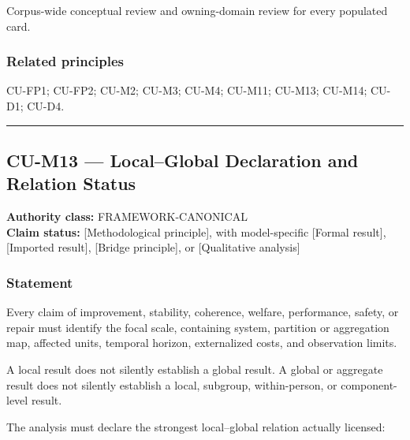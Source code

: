 \documentclass[
  11pt,
]{article}
\begin{document}
Corpus-wide conceptual review and owning-domain review for every
populated card.

\subsubsection{Related principles}\label{related-principles-3}

CU-FP1; CU-FP2; CU-M2; CU-M3; CU-M4; CU-M11; CU-M13; CU-M14; CU-D1;
CU-D4.

\begin{center}\rule{0.5\linewidth}{0.5pt}\end{center}

\subsection{CU-M13 --- Local--Global Declaration and Relation
Status}\label{cu-m13-localglobal-declaration-and-relation-status}

\textbf{Authority class:} FRAMEWORK-CANONICAL\\
\textbf{Claim status:} {[}Methodological principle{]}, with
model-specific {[}Formal result{]}, {[}Imported result{]}, {[}Bridge
principle{]}, or {[}Qualitative analysis{]}

\subsubsection{Statement}\label{statement-21}

Every claim of improvement, stability, coherence, welfare, performance,
safety, or repair must identify the focal scale, containing system,
partition or aggregation map, affected units, temporal horizon,
externalized costs, and observation limits.

A local result does not silently establish a global result. A global or
aggregate result does not silently establish a local, subgroup,
within-person, or component-level result.

The analysis must declare the strongest local--global relation actually
licensed:
\end{document}
